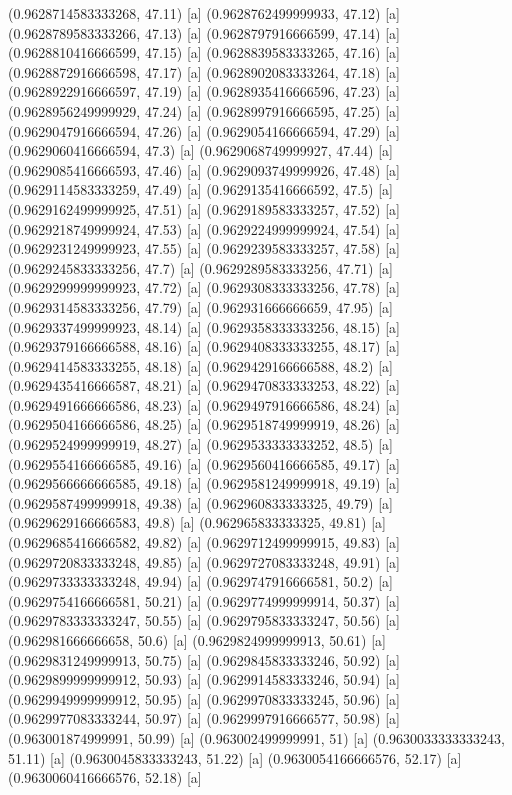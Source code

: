 {{{(0.9628714583333268, 47.11) [a] 
(0.9628762499999933, 47.12) [a] 
(0.9628789583333266, 47.13) [a] 
(0.9628797916666599, 47.14) [a] 
(0.9628810416666599, 47.15) [a] 
(0.9628839583333265, 47.16) [a] 
(0.9628872916666598, 47.17) [a] 
(0.9628902083333264, 47.18) [a] 
(0.9628922916666597, 47.19) [a] 
(0.9628935416666596, 47.23) [a] 
(0.9628956249999929, 47.24) [a] 
(0.9628997916666595, 47.25) [a] 
(0.9629047916666594, 47.26) [a] 
(0.9629054166666594, 47.29) [a] 
(0.9629060416666594, 47.3) [a] 
(0.9629068749999927, 47.44) [a] 
(0.9629085416666593, 47.46) [a] 
(0.9629093749999926, 47.48) [a] 
(0.9629114583333259, 47.49) [a] 
(0.9629135416666592, 47.5) [a] 
(0.9629162499999925, 47.51) [a] 
(0.9629189583333257, 47.52) [a] 
(0.9629218749999924, 47.53) [a] 
(0.9629224999999924, 47.54) [a] 
(0.9629231249999923, 47.55) [a] 
(0.9629239583333257, 47.58) [a] 
(0.9629245833333256, 47.7) [a] 
(0.9629289583333256, 47.71) [a] 
(0.9629299999999923, 47.72) [a] 
(0.9629308333333256, 47.78) [a] 
(0.9629314583333256, 47.79) [a] 
(0.962931666666659, 47.95) [a] 
(0.9629337499999923, 48.14) [a] 
(0.9629358333333256, 48.15) [a] 
(0.9629379166666588, 48.16) [a] 
(0.9629408333333255, 48.17) [a] 
(0.9629414583333255, 48.18) [a] 
(0.9629429166666588, 48.2) [a] 
(0.9629435416666587, 48.21) [a] 
(0.9629470833333253, 48.22) [a] 
(0.9629491666666586, 48.23) [a] 
(0.9629497916666586, 48.24) [a] 
(0.9629504166666586, 48.25) [a] 
(0.9629518749999919, 48.26) [a] 
(0.9629524999999919, 48.27) [a] 
(0.9629533333333252, 48.5) [a] 
(0.9629554166666585, 49.16) [a] 
(0.9629560416666585, 49.17) [a] 
(0.9629566666666585, 49.18) [a] 
(0.9629581249999918, 49.19) [a] 
(0.9629587499999918, 49.38) [a] 
(0.962960833333325, 49.79) [a] 
(0.9629629166666583, 49.8) [a] 
(0.962965833333325, 49.81) [a] 
(0.9629685416666582, 49.82) [a] 
(0.9629712499999915, 49.83) [a] 
(0.9629720833333248, 49.85) [a] 
(0.9629727083333248, 49.91) [a] 
(0.9629733333333248, 49.94) [a] 
(0.9629747916666581, 50.2) [a] 
(0.9629754166666581, 50.21) [a] 
(0.9629774999999914, 50.37) [a] 
(0.9629783333333247, 50.55) [a] 
(0.9629795833333247, 50.56) [a] 
(0.962981666666658, 50.6) [a] 
(0.9629824999999913, 50.61) [a] 
(0.9629831249999913, 50.75) [a] 
(0.9629845833333246, 50.92) [a] 
(0.9629899999999912, 50.93) [a] 
(0.9629914583333246, 50.94) [a] 
(0.9629949999999912, 50.95) [a] 
(0.9629970833333245, 50.96) [a] 
(0.9629977083333244, 50.97) [a] 
(0.9629997916666577, 50.98) [a] 
(0.963001874999991, 50.99) [a] 
(0.963002499999991, 51) [a] 
(0.9630033333333243, 51.11) [a] 
(0.9630045833333243, 51.22) [a] 
(0.9630054166666576, 52.17) [a] 
(0.9630060416666576, 52.18) [a] 
}}}
